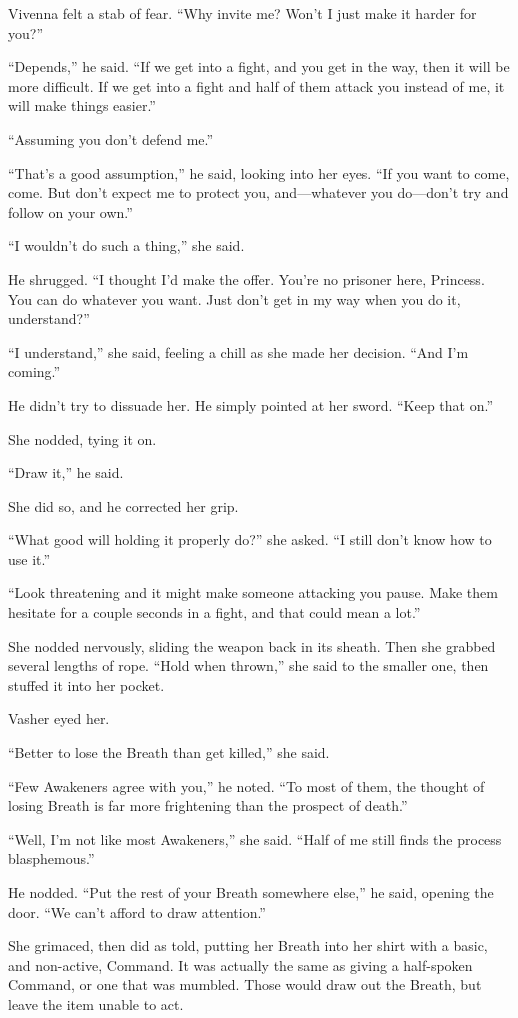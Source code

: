Vivenna felt a stab of fear. “Why invite me? Won’t I just make it harder for you?”

“Depends,” he said. “If we get into a fight, and you get in the way, then it will be more difficult. If we get into a fight and half of them attack you instead of me, it will make things easier.”

“Assuming you don’t defend me.”

“That’s a good assumption,” he said, looking into her eyes. “If you want to come, come. But don’t expect me to protect you, and—whatever you do—don’t try and follow on your own.”

“I wouldn’t do such a thing,” she said.

He shrugged. “I thought I’d make the offer. You’re no prisoner here, Princess. You can do whatever you want. Just don’t get in my way when you do it, understand?”

“I understand,” she said, feeling a chill as she made her decision. “And I’m coming.”

He didn’t try to dissuade her. He simply pointed at her sword. “Keep that on.”

She nodded, tying it on.

“Draw it,” he said.

She did so, and he corrected her grip.

“What good will holding it properly do?” she asked. “I still don’t know how to use it.”

“Look threatening and it might make someone attacking you pause. Make them hesitate for a couple seconds in a fight, and that could mean a lot.”

She nodded nervously, sliding the weapon back in its sheath. Then she grabbed several lengths of rope. “Hold when thrown,” she said to the smaller one, then stuffed it into her pocket.

Vasher eyed her.

“Better to lose the Breath than get killed,” she said.

“Few Awakeners agree with you,” he noted. “To most of them, the thought of losing Breath is far more frightening than the prospect of death.”

“Well, I’m not like most Awakeners,” she said. “Half of me still finds the process blasphemous.”

He nodded. “Put the rest of your Breath somewhere else,” he said, opening the door. “We can’t afford to draw attention.”

She grimaced, then did as told, putting her Breath into her shirt with a basic, and non-active, Command. It was actually the same as giving a half-spoken Command, or one that was mumbled. Those would draw out the Breath, but leave the item unable to act.

